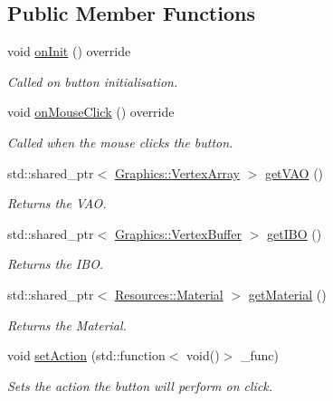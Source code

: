 \subsection*{Public Member Functions}
\begin{DoxyCompactItemize}
\item 
void \hyperlink{class_cookie_eng_1_1_components_1_1_g_u_i_1_1_u_i_button_ad045368b7a595ddaa70cc18112f98221}{on\+Init} () override
\begin{DoxyCompactList}\small\item\em Called on button initialisation. \end{DoxyCompactList}\item 
void \hyperlink{class_cookie_eng_1_1_components_1_1_g_u_i_1_1_u_i_button_a236c38fd81450e39f138f06a8b2003b0}{on\+Mouse\+Click} () override
\begin{DoxyCompactList}\small\item\em Called when the mouse clicks the button. \end{DoxyCompactList}\item 
std\+::shared\+\_\+ptr$<$ \hyperlink{class_cookie_eng_1_1_graphics_1_1_vertex_array}{Graphics\+::\+Vertex\+Array} $>$ \hyperlink{class_cookie_eng_1_1_components_1_1_g_u_i_1_1_u_i_button_a78dc9404b74f95f9ceb48f9f92655493}{get\+V\+AO} ()
\begin{DoxyCompactList}\small\item\em Returns the V\+AO. \end{DoxyCompactList}\item 
std\+::shared\+\_\+ptr$<$ \hyperlink{class_cookie_eng_1_1_graphics_1_1_vertex_buffer}{Graphics\+::\+Vertex\+Buffer} $>$ \hyperlink{class_cookie_eng_1_1_components_1_1_g_u_i_1_1_u_i_button_a4ba5f52cb1775770b24e2ec0e9207ed4}{get\+I\+BO} ()
\begin{DoxyCompactList}\small\item\em Returns the I\+BO. \end{DoxyCompactList}\item 
std\+::shared\+\_\+ptr$<$ \hyperlink{class_cookie_eng_1_1_resources_1_1_material}{Resources\+::\+Material} $>$ \hyperlink{class_cookie_eng_1_1_components_1_1_g_u_i_1_1_u_i_button_a7f77d231424f159a9ce6e5f77a594045}{get\+Material} ()
\begin{DoxyCompactList}\small\item\em Returns the Material. \end{DoxyCompactList}\item 
void \hyperlink{class_cookie_eng_1_1_components_1_1_g_u_i_1_1_u_i_button_a94a07549ec192e4f0632a540cafc8365}{set\+Action} (std\+::function$<$ void()$>$ \+\_\+func)
\begin{DoxyCompactList}\small\item\em Sets the action the button will perform on click. \end{DoxyCompactList}\end{DoxyCompactItemize}
